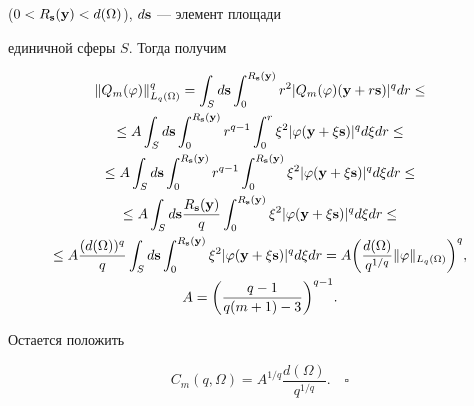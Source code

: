 (${0<R_{\bold{s}}(\bold{y})<d(\Omega)}$), $d\bold{s}$ --- элемент площади


единичной сферы $S$. Тогда получим


\begin{gather*}


\|Q_m(\varphi)\|_{L_q(\Omega)}^q=\int_Sd\bold{s}


\int_0^{R_{\bold{s}}(\bold{y})}r^2|Q_m(\varphi)(\bold{y}+r\bold{s})|^q


dr\leq \\


%


\leq A\int_S


d\bold{s}\int_0^{R_{\bold{s}}(\bold{y})}r^{q-1}\int_0^r\xi^2


|\varphi(\bold{y}+\xi\bold{s})|^qd\xi dr\leq \\


%


\leq A \int_Sd\bold{s}


\int_0^{R_{\bold{s}}(\bold{y})}r^{q-1}\int_0^


{R_{\bold{s}}(\bold{y})}\xi^2|\varphi(\bold{y}+\xi\bold{s})|^qd\xi


dr\leq \\


%


\leq A \int_Sd\bold{s}


\frac{R_{\bold{s}}(\bold{y})}{q}\int_0^


{R_{\bold{s}}(\bold{y})}\xi^2|\varphi(\bold{y}+\xi\bold{s})|^qd\xi


dr\leq \\


%


\leq A \frac{(d(\Omega))^q}


{q}\int_Sd\bold{s}\int_0^{R_{\bold{s}}(\bold{y})}\xi^2


|\varphi(\bold{y}+\xi\bold{s})|^qd\xi dr=


A\bigg(\frac{d(\Omega)}{q^{1/q}}\|\varphi\|_{L_q(\Omega)}\bigg)^q,\\


%


A=\bigg(\frac{q-1}{q(m+1)-3}\bigg)^{q-1}.


\end{gather*}


Остается положить


\begin{equation}


\label{cq}


C_m(q,\Omega)=A^{{1}/{q}}


\frac{d(\Omega)}{q^{1/q}}.\quad\square


\end{equation}


